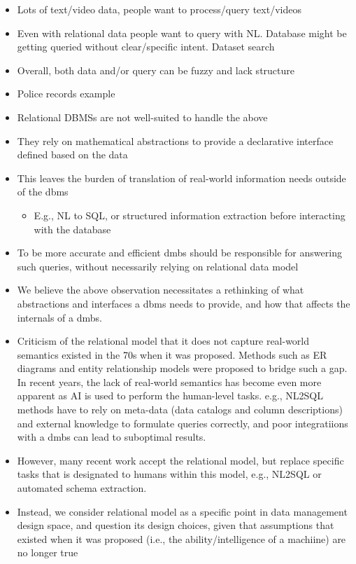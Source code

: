 \begin{itemize}
    \item Lots of text/video data, people want to process/query text/videos
    \item Even with relational data people want to query with NL. Database might be getting queried without clear/specific intent. Dataset search
    \item Overall, both data and/or query can be fuzzy and lack structure
    \item Police records example
\end{itemize}

\begin{itemize}
    \item  Relational DBMSs are not well-suited to handle the above
    \item They rely on mathematical abstractions to provide a declarative interface defined based on the data
    \item This leaves the burden of translation of real-world information needs outside of the dbms
    \begin{itemize}
        \item E.g., NL to SQL, or structured information extraction before interacting with the database
    \end{itemize}
    \item To be more accurate and efficient dmbs should be responsible for answering such queries, without necessarily relying on relational data model
\end{itemize}


\begin{itemize}
    \item We believe the above observation necessitates a rethinking of what abstractions and interfaces a dbms needs to provide, and how that affects the internals of a dmbs.
    \item Criticism of the relational model that it does not capture real-world semantics existed in the 70s when it was proposed. Methods such as ER diagrams and entity relationship models were proposed to bridge such a gap. In recent years, the lack of real-world semantics has become even more apparent as AI is used to perform the human-level tasks. e.g., NL2SQL methods have to rely on meta-data (data catalogs and column descriptions) and external knowledge to formulate queries correctly, and poor integratiions with a dmbs can lead to suboptimal results.  
    \item  However, many recent work accept the relational model, but replace specific tasks that is designated to humans within this model, e.g., NL2SQL or automated schema extraction. 
    \item Instead, we consider relational model as a specific point in data management design space, and question its design choices, given that assumptions that existed when it was proposed  (i.e., the ability/intelligence of a machiine) are no longer true
\end{itemize}
    



